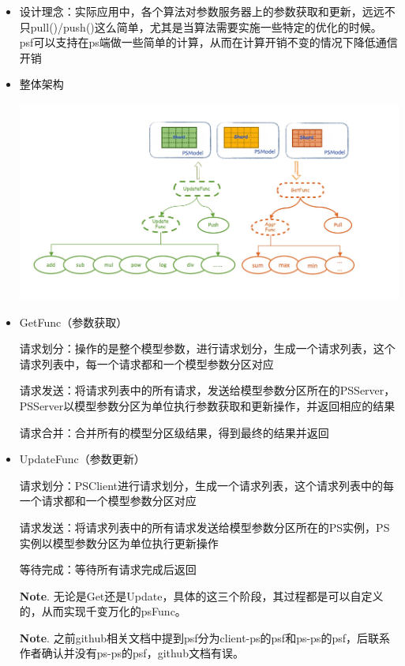 \documentclass{article}
\begin{document}
\begin{itemize}[noitemsep,topsep=\mdcompacttopsep]%

\item{}设计理念：实际应用中，各个算法对参数服务器上的参数获取和更新，远远不只pull()/push()这么简单，尤其是当算法需要实施一些特定的优化的时候。
psf可以支持在ps端做一些简单的计算，从而在计算开销不变的情况下降低通信开销%

\item{}
整体架构%

\includegraphics[keepaspectratio=true,width=\dimmin{}{\dimwidth{0.90}}]{images/angel_psFunc}{}%

\item{}
GetFunc（参数获取）%

请求划分：操作的是整个模型参数，进行请求划分，生成一个请求列表，这个请求列表中，每一个请求都和一个模型参数分区对应%

请求发送：将请求列表中的所有请求，发送给模型参数分区所在的PSServer，PSServer以模型参数分区为单位执行参数获取和更新操作，并返回相应的结果%

请求合并：合并所有的模型分区级结果，得到最终的结果并返回%

\item{}
UpdateFunc（参数更新）%

请求划分：PSClient进行请求划分，生成一个请求列表，这个请求列表中的每一个请求都和一个模型参数分区对应%

请求发送：将请求列表中的所有请求发送给模型参数分区所在的PS实例，PS实例以模型参数分区为单位执行更新操作%

等待完成：等待所有请求完成后返回%

\noindent{}\textbf{Note}.
无论是Get还是Update，具体的这三个阶段，其过程都是可以自定义的，从而实现千变万化的psFunc。%

\noindent{}\textbf{Note}.
之前github相关文档中提到psf分为client-ps的psf和ps-ps的psf，后联系作者确认并没有ps-ps的psf，github文档有误。%
\end{itemize}%
\end{document}
